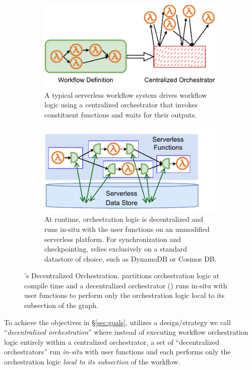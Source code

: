 \begin{figure}[t]
\begin{subfigure}[t]{0.8\textwidth}
	\end{subfigure}
	\begin{subfigure}[b]{\columnwidth}
		\centering
		\includegraphics[width=0.8\columnwidth]{figures/unum-arch-centralized.pdf}
		\caption{A typical serverless workflow system drives workflow logic
			using a centralized orchestrator that invokes constituent
			functions and waits for their outputs.}
		\label{fig:arch:centralized}
	\end{subfigure}
	\hfill
	\begin{subfigure}[b]{\columnwidth}
		\centering
		\includegraphics[width=.7\columnwidth]{figures/unum-arch-runtime.pdf}
		\caption{At runtime, \name{} orchestration logic is decentralized and
			runs in-situ with the user functions on an unmodified serverless
			platform. For synchronization and checkpointing,
			\name{} relies exclusively on a standard datastore of choice, such
			as DynamoDB or Cosmos DB.}
		\label{fig:arch:unum-runtime}
	\end{subfigure}
	\caption{\name{}'s Decentralized Orchestration. \name{} partitions
	orchestration logic at compile time and a decentralized orchestrator
	(\deorc{}) runs in-situ with user functions to perform only the
	orchestration logic local to its subsection of the graph.}
	\label{fig:arch}
\end{figure}

To achieve the objectives in \S\ref{sec:goals}, \name{} utilizes a
design/strategy we call ``\emph{decentralized orchestration}'' where instead
of executing workflow orchestration logic entirely within a centralized
orchestrator, a set of ``decentralized orchestrators'' run \emph{in-situ} with
user functions and each performs only the orchestration logic \emph{local to
its subsection} of the workflow.

